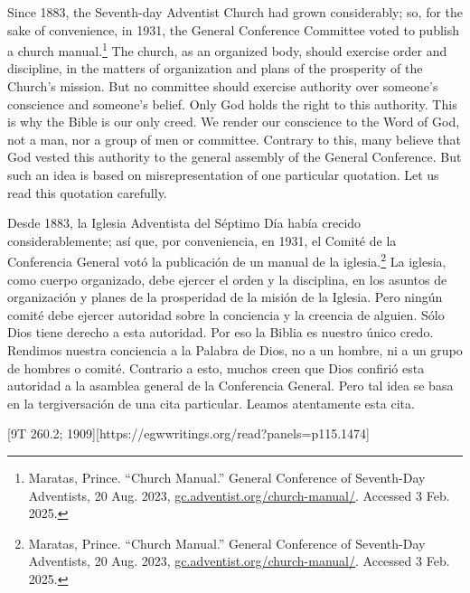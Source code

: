 Since 1883, the Seventh-day Adventist Church had grown considerably; so, for the sake of convenience, in 1931, the General Conference Committee voted to publish a church manual.\footnote{Maratas, Prince. “Church Manual.” General Conference of Seventh-Day Adventists, 20 Aug. 2023, \href{https://gc.adventist.org/church-manual/}{gc.adventist.org/church-manual/}. Accessed 3 Feb. 2025.} The church, as an organized body, should exercise order and discipline, in the matters of organization and plans of the prosperity of the Church's mission. But no committee should exercise authority over someone’s conscience and someone’s belief. Only God holds the right to this authority. This is why the Bible is our only creed. We render our conscience to the Word of God, not a man, nor a group of men or committee. Contrary to this, many believe that God vested this authority to the general assembly of the General Conference. But such an idea is based on misrepresentation of one particular quotation. Let us read this quotation carefully.


Desde 1883, la Iglesia Adventista del Séptimo Día había crecido considerablemente; así que, por conveniencia, en 1931, el Comité de la Conferencia General votó la publicación de un manual de la iglesia.\footnote{Maratas, Prince. “Church Manual.” General Conference of Seventh-Day Adventists, 20 Aug. 2023, \href{https://gc.adventist.org/church-manual/}{gc.adventist.org/church-manual/}. Accessed 3 Feb. 2025.} La iglesia, como cuerpo organizado, debe ejercer el orden y la disciplina, en los asuntos de organización y planes de la prosperidad de la misión de la Iglesia. Pero ningún comité debe ejercer autoridad sobre la conciencia y la creencia de alguien. Sólo Dios tiene derecho a esta autoridad. Por eso la Biblia es nuestro único credo. Rendimos nuestra conciencia a la Palabra de Dios, no a un hombre, ni a un grupo de hombres o comité. Contrario a esto, muchos creen que Dios confirió esta autoridad a la asamblea general de la Conferencia General. Pero tal idea se basa en la tergiversación de una cita particular. Leamos atentamente esta cita.


[9T 260.2; 1909][https://egwwritings.org/read?panels=p115.1474]


